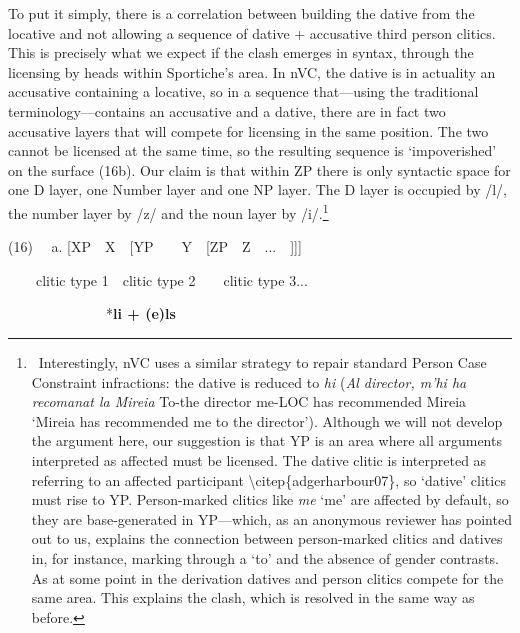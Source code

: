 \documentclass[12pt]{article}
\newenvironment{styleStandard}{\setlength\leftskip{0cm}\setlength\rightskip{0cm}\setlength\parindent{0cm}\setlength\parfillskip{0pt plus 1fil}\setlength\parskip{0in plus 1pt}\writerlistparindent\writerlistleftskip\leavevmode\normalfont\normalsize\writerlistlabel\ignorespaces}{\unskip\vspace{0.111in plus 0.0111in}\par}
\newcommand\writerlistleftskip{}
\newcommand\writerlistparindent{}
\newcommand\writerlistlabel{}
\begin{document}
\begin{styleStandard}
To put it simply, there is a correlation between building the dative from the locative and not allowing a sequence of dative + accusative third person clitics. This is precisely what we expect if the clash emerges in syntax, through the licensing by heads within Sportiche’s area. In nVC, the dative is in actuality an accusative containing a locative, so in a sequence that—using the traditional terminology—contains an accusative and a dative, there are in fact two accusative layers that will compete for licensing in the same position. The two cannot be licensed at the same time, so the resulting sequence is ‘impoverished’ on the surface (16b). Our claim is that within ZP there is only syntactic space for one D layer, one Number layer and one NP layer. The D layer is occupied by /l/, the number layer by /z/ and the noun layer by /i/.\footnote{\ Interestingly, nVC uses a similar strategy to repair standard Person Case Constraint infractions: the dative is reduced to \textit{hi} (\textit{Al director, m’hi ha recomanat la Mireia} To-the director me-LOC has recommended Mireia ‘Mireia has recommended me to the director’). Although we will not develop the argument here, our suggestion is that YP is an area where all arguments interpreted as affected must be licensed. The dative clitic is interpreted as referring to an affected participant {\textbackslash}citep\{adgerharbour07\}, so ‘dative’ clitics must rise to YP. Person-marked clitics like \textit{me} ‘me’ are affected by default, so they are base{}-generated in YP—which, as an anonymous reviewer has pointed out to us, explains the connection between person-marked clitics and datives in, for instance, marking through a ‘to’ and the absence of gender contrasts. As at some point in the derivation datives and person clitics compete for the same area. This explains the clash, which is resolved in the same way as before. } 
\end{styleStandard}

\begin{styleStandard}
(16) \ \ a. [XP\ \ X\ \ [YP\ \ \ \ Y\ \ [ZP\ \ Z\ \ ...\ \ ]]]
\end{styleStandard}

\begin{styleStandard}
\ \  \ \ clitic type 1\ \ clitic type 2\ \ \ \ clitic type 3...
\end{styleStandard}

\begin{styleStandard}
\ \ \ \ \ \ \ \ \ \ \ \ \ \ *\textbf{li + (e)ls}
\end{styleStandard}
\end{document}
